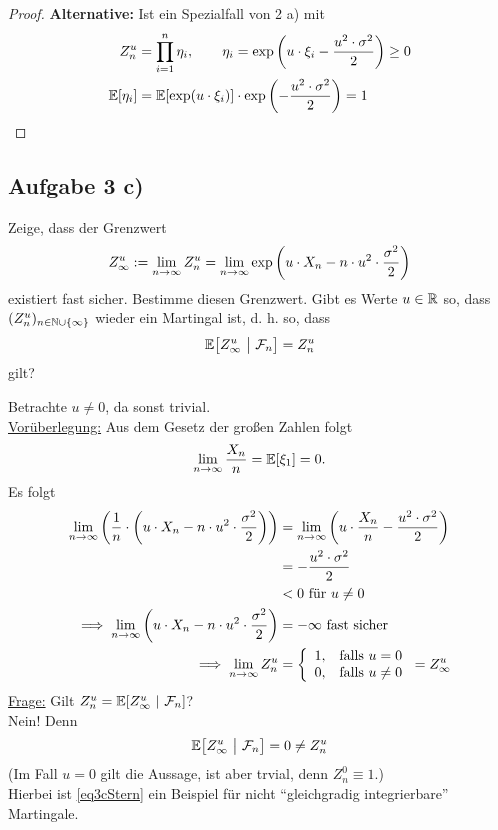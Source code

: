 \documentclass[12pt,a4paper]{article}
\begin{document}
\begin{proof}
\textbf{Alternative:} Ist ein Spezialfall von 2 a) mit
\begin{align*}
Z_n^u&=\prod\limits_{i=1}^n\eta_i,\qquad\eta_i=\exp\left(u\cdot\xi_i-\frac{u^2\cdot\sigma^2}{2}\right)\geq0\\
\mathbb{E}[\eta_i]&=\mathbb{E}[\exp(u\cdot\xi_i)]\cdot\exp\left(-\frac{u^2\cdot\sigma^2}{2}\right)=1
\end{align*}
\end{proof}

\subsection*{Aufgabe 3 c)}
Zeige, dass der Grenzwert
\begin{align*}
Z_\infty^u:=\lim\limits_{n\to\infty} Z^u_n=\lim\limits_{n\to\infty}\exp\left(u\cdot X_n-n\cdot u^2\cdot\frac{\sigma^2}{2}\right)
\end{align*}
existiert fast sicher. Bestimme diesen Grenzwert. Gibt es Werte $u\in\mathbb{R}$ so, dass $(Z_n^u)_{n\in\mathbb{N}\cup\lbrace\infty\rbrace}$ wieder ein Martingal ist, d. h. so, dass
\begin{align*}
\mathbb{E}\big[Z^u_\infty~\big|~\mathcal{F}_n\big]=Z^u_n
\end{align*}
gilt?

\begin{lösung}
Betrachte $u\neq0$, da sonst trivial.\\

\underline{Vorüberlegung:}
Aus dem Gesetz der großen Zahlen folgt
\begin{align*}
\lim\limits_{n\to\infty}\frac{X_n}{n}=\mathbb{E}[\xi_1]=0.
\end{align*}
Es folgt
\begin{align*}
\lim\limits_{n\to\infty}\left(\frac{1}{n}\cdot\left( u\cdot X_n-n\cdot u^2\cdot\frac{\sigma^2}{2}\right)\right)
&=\lim\limits_{n\to\infty}\left(u\cdot\frac{X_n}{n}-\frac{u^2\cdot\sigma^2}{2}\right)\\
&=-\frac{u^2\cdot\sigma^2}{2}\\
&<0\text{ für }u\neq0\\
\implies
\lim\limits_{n\to\infty}\left( u\cdot X_n-n\cdot u^2\cdot\frac{\sigma^2}{2}\right)&=-\infty\text{ fast sicher }\\
\implies
\lim\limits_{n\to\infty} Z_n^u&=\left\lbrace\begin{array}{cl}
1, & \text{falls } u=0\\
0, & \text{falls } u\neq 0
\end{array}\right.
=Z_\infty^u
\end{align*}
\underline{Frage:} Gilt $Z_n^u=\mathbb{E}[Z_\infty^u~|~\mathcal{F}_n]$?\\
Nein! Denn 
\begin{align}\label{eq3cStern}
\mathbb{E}\big[Z_\infty^u~\big|~\mathcal{F}_n\big]=0\neq Z_n^u
\end{align}
(Im Fall $u=0$ gilt die Aussage, ist aber trvial, denn $Z_n^0\equiv 1$.)\\
Hierbei ist \eqref{eq3cStern} ein Beispiel für nicht ``gleichgradig integrierbare'' Martingale.
\end{lösung}
\end{document}
